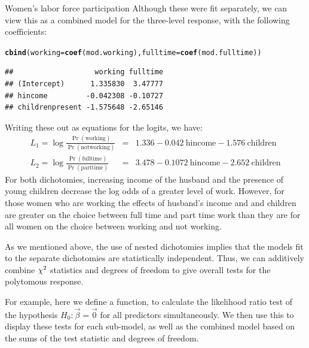 \documentclass[11pt]{book}\usepackage[]{graphicx}\usepackage[]{color}
\makeatletter
\newcommand{\hlstd}[1]{\textcolor[rgb]{0.345,0.345,0.345}{#1}}%
\newcommand{\hlkwc}[1]{\textcolor[rgb]{0.333,0.667,0.333}{#1}}%
\newcommand{\hlkwd}[1]{\textcolor[rgb]{0.737,0.353,0.396}{\textbf{#1}}}%
\newenvironment{kframe}{%
 \def\at@end@of@kframe{}%
 \ifinner\ifhmode%
  \def\at@end@of@kframe{\end{minipage}}%
  \begin{minipage}{\columnwidth}%
 \fi\fi%
 \def\FrameCommand##1{\hskip\@totalleftmargin \hskip-\fboxsep
 \colorbox{shadecolor}{##1}\hskip-\fboxsep
     \hskip-\linewidth \hskip-\@totalleftmargin \hskip\columnwidth}%
 \MakeFramed {\advance\hsize-\width
   \@totalleftmargin\z@ \linewidth\hsize
   \@setminipage}}%
 {\par\unskip\endMakeFramed%
 \at@end@of@kframe}
\newenvironment{knitrout}{}{} %
\renewenvironment{knitrout}{\small\renewcommand{\baselinestretch}{.85}}{} %
\makeatother
\begin{document}
\begin{Example}[wlfpart1]{Women's labor force participation}
Although these were fit separately, we can view this as a
combined model for the three-level response, with the following coefficients:  
\begin{knitrout}
\color{fgcolor}\begin{kframe}
\begin{alltt}
\hlkwd{cbind}\hlstd{(}\hlkwc{working}\hlstd{=}\hlkwd{coef}\hlstd{(mod.working),} \hlkwc{fulltime}\hlstd{=}\hlkwd{coef}\hlstd{(mod.fulltime))}
\end{alltt}
\begin{verbatim}
##                   working fulltime
## (Intercept)      1.335830  3.47777
## hincome         -0.042308 -0.10727
## childrenpresent -1.575648 -2.65146
\end{verbatim}
\end{kframe}
\end{knitrout}
Writing these out as equations for the logits, we have:
\begin{eqnarray}
 L_1 = \log \frac{\Pr (\mathrm{working})}{\Pr (\mathrm{not working})} &=&
    1.336 - 0.042 \: \mathrm{hincome} - 1.576 \: \mathrm{children} \label{eq:wlf-logits} \\
 L_2 = \log \frac{\Pr (\mathrm{fulltime})}{\Pr (\mathrm{parttime})} &=&
    3.478 - 0.1072 \: \mathrm{hincome} - 2.652 \: \mathrm{children} 
\end{eqnarray}
For both dichotomies, increasing income of the husband and the 
presence of young children decrease the log odds of a greater
level of work.  However, for those women who are working
the effects of husband's income and 
and children are greater on the choice between full time
and part time work than they are for all women
on the choice between working and not working.

As we mentioned above, the use of nested dichotomies implies that
the models fit to the separate dichotomies are statistically
independent.  Thus, we can additively combine $\chi^2$ statistics
and degrees of freedom to give overall tests for the polytomous
response.  

For example, here we define a function,
 to calculate the likelihood ratio
test of the hypothesis $H_0 : \vec{\beta}=\vec{0}$ for all predictors
simultaneously.
We then use this
to display these tests for each sub-model, as well as the
combined model based on the sums of the test statistic
and degrees of freedom.


\end{Example}
\end{document}
